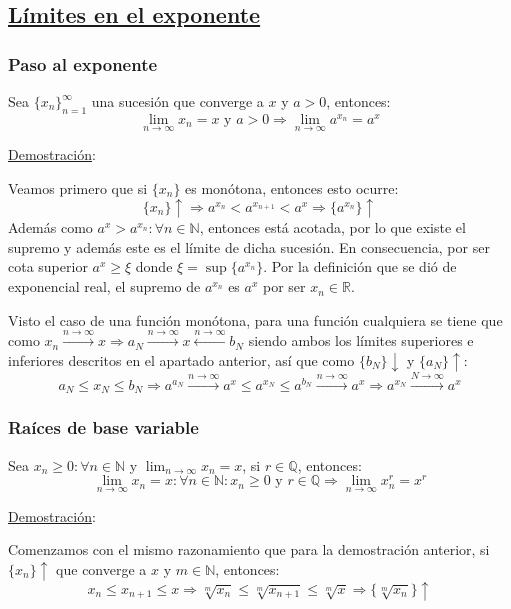 \documentclass[10pt,a4paper,openright]{book}
\begin{document}
\subsection*{\underline{Límites en el exponente}}
\subsubsection*{Paso al exponente}
Sea $\{x_n\}_{n=1}^\infty$ una sucesión que converge a $x$ y $a>0$, entonces:
$$\lim_{n\rightarrow \infty} x_n = x \mbox{ y }a>0\Rightarrow \lim_{n\rightarrow\infty} a^{x_n}=a^x$$

\underline{Demostración}:\par
Veamos primero que si $\{x_n\}$ es monótona, entonces esto ocurre:
$$\{x_n\}\uparrow\Rightarrow a^{x_n}<a^{x_{n+1}}<a^x \Rightarrow \{a^{x_n}\} \uparrow$$
Además como $a^x>a^{x_n}:\forall n\in \mathbb N$, entonces está acotada, por lo que existe el supremo y además este es el límite de dicha sucesión. En consecuencia, por ser cota superior $a^x\geq \xi$ donde $\xi=\sup\{a^{x_n}\}$. Por la definición que se dió de exponencial real, el supremo de $a^{x_n}$ es $a^x$ por ser $x_n\in \mathbb R$.

Visto el caso de una función monótona, para una función cualquiera se tiene que como $x_n\xrightarrow{n\rightarrow\infty} x\Rightarrow a_N\xrightarrow{n\rightarrow\infty}x\xleftarrow{n\rightarrow\infty} b_N$ siendo ambos los límites superiores e inferiores descritos en el apartado anterior, así que como $\{b_N\}\downarrow$ y $\{a_N\}\uparrow$:
$$a_N\leq x_N\leq b_N \Rightarrow a^{a_N}\xrightarrow{n\rightarrow\infty}a^x\leq a^{x_N}\leq a^{b_N}\xrightarrow{n\rightarrow\infty}a^x\Rightarrow a^{x_N}\xrightarrow{N\rightarrow\infty}a^x$$

\subsubsection*{Raíces de base variable}
Sea $x_n\geq 0: \forall n\in \mathbb N$ y $\lim_{n\rightarrow\infty} x_n = x$, si $r\in \mathbb Q$, entonces:
$$\lim_{n\rightarrow \infty}x_n = x: \forall n\in \mathbb N: x_n\geq 0 \mbox{ y }r\in \mathbb Q\Rightarrow \lim_{n\rightarrow\infty}x_n^{r} = x^r$$

\underline{Demostración}:\par
Comenzamos con el mismo razonamiento que para la demostración anterior, si $\{x_n\}\uparrow$ que converge a $x$ y $m\in \mathbb N$, entonces:
$$x_n\leq x_{n+1}\leq x\Rightarrow \sqrt[m]{x_n}\leq \sqrt[m]{x_{n+1}}\leq \sqrt[m]{x} \Rightarrow \{\sqrt[m]{x_n}\}\uparrow$$
\end{document}

